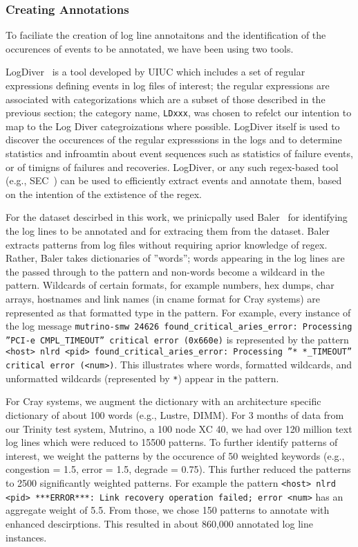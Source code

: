 \subsubsection{Creating Annotations}

To faciliate the creation of log line annotaitons
and the identification of the occurences of events to be annotated,
we have been using two tools.

LogDiver~\cite{LogDiver} is a tool developed by UIUC which includes a set of regular expressions defining
events in log files of interest; the regular expressions are associated with categorizations
which are a subset of those described in the previous section; the
category name, \texttt{LDxxx}, was chosen to refelct our intention to map to the
Log Diver categroizations where possible.
LogDiver itself is used to discover the occurences of the regular
expresssions in the logs and to determine statistics and infroamtin about event sequences
such as statistics of failure events, or of timigns of failures and recoveries.
LogDiver, or any such regex-based tool (e.g., SEC~\cite{SEC}) can be used to efficiently extract events
and annotate them, based on the intention of the extistence of the regex.

For the dataset descirbed in this work, we prinicpally used Baler~\cite{Baler} for
identifying the log lines to be annotated and for extracing them from the dataset.
Baler extracts patterns from log files without requiring aprior knowledge of
regex. Rather, Baler takes dictionaries of ''words''; words appearing in the log lines
are the passed through to the pattern and non-words become a wildcard in the pattern.
Wildcards of certain formats, for example numbers, hex dumps, char arrays, hostnames and link names
(in cname format for Cray systems) are represented as that formatted type in the pattern.
For example, every instance of the log message \texttt{mutrino-smw 24626 found\_critical\_aries\_error: Processing ''PCI-e CMPL\_TIMEOUT'' critical error (0x660e)}
is represented by the pattern \texttt{<host> nlrd <pid> found\_critical\_aries\_error: Processing ''* *\_TIMEOUT'' critical error (<num>)}.
This illustrates where words, formatted wildcards, and unformatted wildcards (represented by \texttt{*}) appear in the pattern.

For Cray systems, we augment
the dictionary with an architecture specific dictionary of about 100 words (e.g., Lustre, DIMM).
For 3 months of data from our Trinity test system, Mutrino, a 100 node XC 40,
we had over 120 million text log lines which were reduced to 15500 patterns. To further identify patterns
of interest, we weight the patterns by the occurence of 50 weighted
keywords (e.g., congestion = 1.5, error = 1.5, degrade = 0.75). This further reduced the patterns
to 2500 significantly weighted patterns. For example the pattern
\texttt{<host> nlrd <pid> ***ERROR***: Link recovery operation failed; error <num>} has
an aggregate weight of 5.5. From those, we chose 150
patterns to annotate with enhanced descirptions. This resulted in about 860,000
annotated log line instances.

